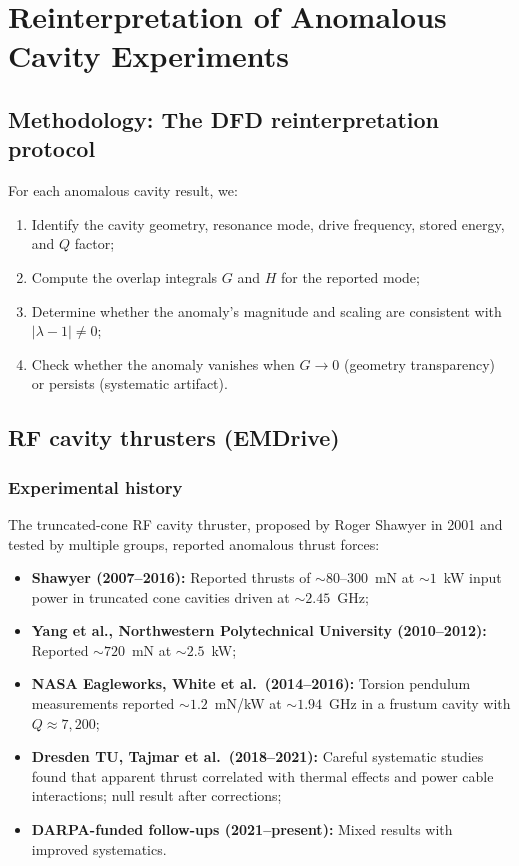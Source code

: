 \documentclass[12pt,aps,prd,twocolumn,superscriptaddress,nofootinbib]{revtex4-2}
\begin{document}
\section{Reinterpretation of Anomalous Cavity Experiments}
\label{sec:anomalous}

\subsection{Methodology: The DFD reinterpretation protocol}

For each anomalous cavity result, we:
\begin{enumerate}[noitemsep]
  \item Identify the cavity geometry, resonance mode, drive frequency,
    stored energy, and $Q$ factor;
  \item Compute the overlap integrals $G$ and $H$ for the reported mode;
  \item Determine whether the anomaly's magnitude and scaling are
    consistent with $|\lambda - 1| \neq 0$;
  \item Check whether the anomaly vanishes when $G \to 0$ (geometry
    transparency) or persists (systematic artifact).
\end{enumerate}

\subsection{RF cavity thrusters (EMDrive)}
\label{sec:emdrive}

\subsubsection{Experimental history}

The truncated-cone RF cavity thruster, proposed by Roger Shawyer in 2001
and tested by multiple groups, reported anomalous thrust forces:
\begin{itemize}[noitemsep]
  \item \textbf{Shawyer (2007--2016):} Reported thrusts of
    $\sim 80$--$300$~mN at $\sim 1$~kW input power in truncated cone
    cavities driven at $\sim 2.45$~GHz;
  \item \textbf{Yang et al., Northwestern Polytechnical University
    (2010--2012):} Reported $\sim 720$~mN at $\sim 2.5$~kW;
  \item \textbf{NASA Eagleworks, White et al.\ (2014--2016):}
    Torsion pendulum measurements reported $\sim 1.2$~mN/kW at
    $\sim 1.94$~GHz in a frustum cavity with $Q \approx 7,200$;
  \item \textbf{Dresden TU, Tajmar et al.\ (2018--2021):}
    Careful systematic studies found that apparent thrust correlated
    with thermal effects and power cable interactions; null result
    after corrections;
  \item \textbf{DARPA-funded follow-ups (2021--present):} Mixed results
    with improved systematics.
\end{itemize}
\end{document}

